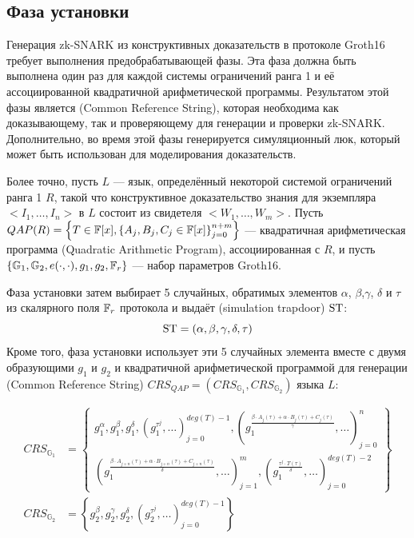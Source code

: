 \subsection{Фаза установки} Генерация zk-SNARK из конструктивных доказательств в протоколе Groth16 требует выполнения предобрабатывающей фазы. Эта фаза должна быть выполнена один раз для каждой системы ограничений ранга 1 и её ассоциированной квадратичной арифметической программы. Результатом этой фазы является  (Common Reference String), которая необходима как доказывающему, так и проверяющему для генерации и проверки zk-SNARK. Дополнительно, во время этой фазы генерируется симуляционный люк, который может быть использован для моделирования доказательств.

Более точно, пусть $L$ --- язык, определённый некоторой системой ограничений ранга 1 $R$, такой что конструктивное доказательство знания для экземпляра $<I_1,\ldots,I_n>$ в $L$ состоит из свидетеля $<W_1,\ldots,W_m>$. Пусть $QAP(R) = \left\{T\in \mathbb{F}[x],\left\{A_j,B_j,C_j\in \mathbb{F}[x]\right\}_{j=0}^{n+m}\right\}$ --- квадратичная арифметическая программа (Quadratic Arithmetic Program), ассоциированная с $R$, и пусть $\{\mathbb{G}_1, \mathbb{G}_2, e(\cdot,\cdot), g_1, g_2, \mathbb{F}_r\}$ --- набор параметров Groth16.

Фаза установки затем выбирает 5 случайных, обратимых элементов $\alpha$, $\beta$,$\gamma$, $\delta$ и $\tau$ из скалярного поля $\mathbb{F}_r$ протокола и выдаёт  (simulation trapdoor) $\mathrm{ST}$:
\begin{equation}
\label{def:groth16-trapdoor}
\mathrm{ST} = (\alpha, \beta, \gamma, \delta, \tau)
\end{equation}
Кроме того, фаза установки использует эти 5 случайных элемента вместе с двумя образующими $g_1$ и $g_2$ и квадратичной арифметической программой для генерации  (Common Reference String) $CRS_{QAP}= (CRS_{\mathbb{G}_1},CRS_{\mathbb{G}_2})$ языка $L$:

\begin{definition}
\begin{align*}
\label{def:groth16-crs}
CRS_{\mathbb{G}_{1}} &= \textstyle\left\{ \begin{array}{c}
g_1^\alpha,g_1^\beta,g_1^\delta,\left(g_1^{\tau^j},\ldots\right)_{j=0}^{deg(T)-1},
\left(g_1^{\frac{\beta\cdot A_{j}(\tau)+\alpha\cdot B_{j}(\tau)+C_{j}(\tau)}{\gamma}},\ldots\right)_{j=0}^n\\
\left(g_1^{\frac{\beta\cdot A_{j+n}(\tau)+\alpha\cdot B_{j+n}(\tau)+C_{j+n}(\tau)}{\delta}},\ldots\right)_{j=1}^m,\left(g_1^{\frac{\tau^{j}\cdot T(\tau)}{\delta}},\ldots\right)_{j=0}^{deg(T)-2}
\end{array}\right\} \\
CRS_{\mathbb{G}_{2}} &= \left\{g_2^\beta ,g_2^\gamma,g_2^\delta,\left(g_2^{\tau^j},\ldots\right) _{j=0}^{deg(T)-1}\right\}
\end{align*}
\end{definition}

